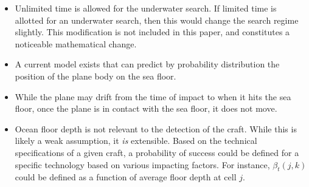 \begin{itemize}
\item Unlimited time is allowed for the underwater search. If limited time is allotted for an underwater search, then this would change the search regime slightly. This modification is not included in this paper, and constitutes a noticeable mathematical change.
\item A current model exists that can predict by probability distribution the position of the plane body on the sea floor.
\item While the plane may drift from the time of impact to when it hits the sea floor, once the plane is in contact with the sea floor, it does not move. 
\item Ocean floor depth is not relevant to the detection of the craft. While this is likely a weak assumption, it \textit{is} extensible. Based on the technical specifications of a given craft, a probability of success could be defined for a specific technology based on various impacting factors. For instance, $\beta_t(j,k)$ could be defined as a function of average floor depth at cell $j$.
\end{itemize}